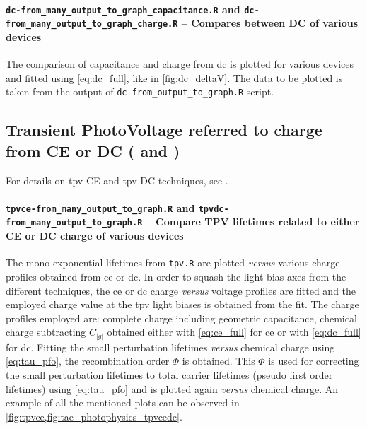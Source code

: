 %		
%		
		\paragraph{\texttt{dc-from\_many\_output\_to\_graph\_capacitance.R} and \texttt{dc-\-from\_many\_output\_to\_graph\_charge.R} -- Compares between DC of various devices}
		The comparison of capacitance and charge from \gls{dc} is plotted for various devices and fitted using \cref{eq:dc_full}, like in \cref{fig:dc_deltaV}.
		The data to be plotted is taken from the output of \texttt{dc-\-from\_output\_to\_graph.R} script.

	\subsection{Transient PhotoVoltage referred to charge from CE or DC ( and )}\label{r_tpvcedc}
		For details on \gls{tpv}-CE and \gls{tpv}-DC techniques, see .
%
%
%
		
				\paragraph{\texttt{tpvce-\-from\_many\_output\_to\_graph.R} and \texttt{tpvdc-\-from\_many\_output\_to\_graph.R} -- Compare TPV lifetimes related to either CE or DC charge of various devices}
The mono\hyp{}exponential lifetimes from \texttt{tpv.R} are plotted \textsl{versus} various charge profiles obtained from \gls{ce} or \gls{dc}.
In order to squash the light bias axes from the different techniques, the \gls{ce} or \gls{dc} charge \textsl{versus} voltage profiles are fitted and the employed charge value at the \gls{tpv} light biases is obtained from the fit.
The charge profiles employed are: complete charge including geometric capacitance, chemical charge subtracting $C_|g|$ obtained either with \cref{eq:ce_full} for \gls{ce} or with \cref{eq:dc_full} for \gls{dc}.
Fitting the small perturbation lifetimes \textsl{versus} chemical charge using \cref{eq:tau_pfo}, the recombination order $\Phi$ is obtained.
This $\Phi$ is used for correcting the small perturbation lifetimes to total carrier lifetimes (pseudo first order lifetimes) using \cref{eq:tau_pfo} and is plotted again \textsl{versus} chemical charge.
An example of all the mentioned plots can be observed in \cref{fig:tpvce,fig:tae_photophysics_tpvcedc}.

